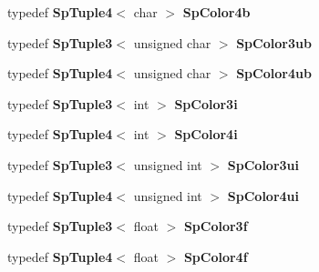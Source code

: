 \begin{CompactItemize}
\item 
typedef {\bf Sp\-Tuple4}$<$ char $>$ {\bf Sp\-Color4b}
\item 
typedef {\bf Sp\-Tuple3}$<$ unsigned char $>$ {\bf Sp\-Color3ub}
\item 
typedef {\bf Sp\-Tuple4}$<$ unsigned char $>$ {\bf Sp\-Color4ub}
\item 
typedef {\bf Sp\-Tuple3}$<$ int $>$ {\bf Sp\-Color3i}
\item 
typedef {\bf Sp\-Tuple4}$<$ int $>$ {\bf Sp\-Color4i}
\item 
typedef {\bf Sp\-Tuple3}$<$ unsigned int $>$ {\bf Sp\-Color3ui}
\item 
typedef {\bf Sp\-Tuple4}$<$ unsigned int $>$ {\bf Sp\-Color4ui}
\item 
typedef {\bf Sp\-Tuple3}$<$ float $>$ {\bf Sp\-Color3f}
\item 
typedef {\bf Sp\-Tuple4}$<$ float $>$ {\bf Sp\-Color4f}
\end{CompactItemize}
